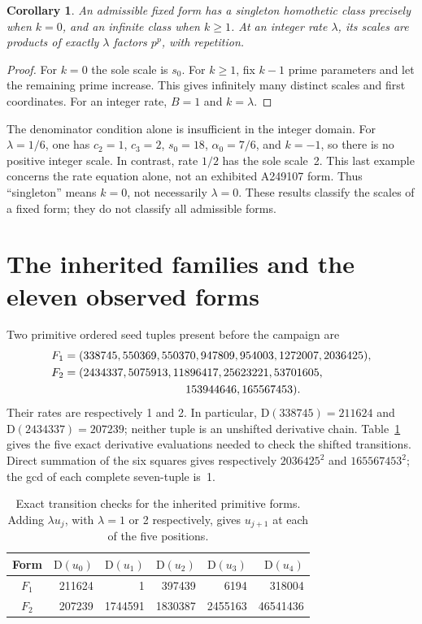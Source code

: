 \documentclass[11pt,a4paper]{article}
\newcommand{\D}{\mathrm{D}}
\newtheorem{corollary}[theorem]{Corollary}
\theoremstyle{definition}
\theoremstyle{remark}
\begin{document}
\begin{corollary}\label{cor:cardinality}
An admissible fixed form has a singleton homothetic class precisely when
$k=0$, and an infinite class when $k\ge1$. At an integer rate $\lambda$,
its scales are products of exactly $\lambda$ factors $p^p$, with repetition.
\end{corollary}
\begin{proof}
For $k=0$ the sole scale is $s_0$. For $k\ge1$, fix $k-1$ prime parameters
and let the remaining prime increase. This gives infinitely many distinct
scales and first coordinates. For an integer rate, $B=1$ and $k=\lambda$.
\end{proof}

The denominator condition alone is insufficient in the integer domain.
For $\lambda=1/6$, one has $c_2=1$, $c_3=2$, $s_0=18$,
$\alpha_0=7/6$, and $k=-1$, so there is no positive integer scale.
In contrast, rate $1/2$ has the sole scale~2. This last example concerns
the rate equation alone, not an exhibited A249107 form. Thus ``singleton''
means $k=0$, not necessarily $\lambda=0$. These results classify the
scales of a fixed form; they do not classify all admissible forms.

\section{The inherited families and the eleven observed forms}\label{sec:forms}

Two primitive ordered seed tuples present before the campaign are
\begin{align}
 F_1={}&(338745,550369,550370,947809,954003,1272007,2036425),
       \label{eq:F1}\\
 F_2={}&(2434337,5075913,11896417,25623221,53701605,\notag\\
       &\hspace{33mm}153944646,165567453).\label{eq:F2}
\end{align}
Their rates are respectively 1 and 2. In particular, $\D(338745)=211624$
and $\D(2434337)=207239$; neither tuple is an unshifted derivative chain.
Table~\ref{tab:transitions} gives the five exact derivative evaluations
needed to check the shifted transitions. Direct summation of the six
squares gives respectively $2036425^2$ and $165567453^2$; the gcd of
each complete seven-tuple is~1.

\begin{table}[htbp]
\centering\small
\begin{tabular}{crrrrr}
\toprule
Form & $\D(u_0)$ & $\D(u_1)$ & $\D(u_2)$ & $\D(u_3)$ & $\D(u_4)$\\
\midrule
$F_1$ &211624&1&397439&6194&318004\\
$F_2$ &207239&1744591&1830387&2455163&46541436\\
\bottomrule
\end{tabular}
\caption{Exact transition checks for the inherited primitive forms.
Adding $\lambda u_j$, with $\lambda=1$ or 2 respectively, gives $u_{j+1}$
at each of the five positions.}\label{tab:transitions}
\end{table}
\end{document}
